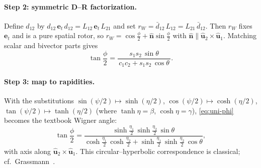 \documentclass[11pt]{article}
\numberwithin{equation}{section}
\providecommand{\uhat}{\hat{\mathbf u}}
\begin{document}
\paragraph{Step 2: symmetric D--R factorization.}
Define $d_{12}$ by $d_{12}\,\mathbf e_t\, d_{12}=L_{12}\,\mathbf e_t\, L_{21}$ and set
$r_W=\bar d_{12}\,L_{12}=L_{21}\,\bar d_{12}$. Then $r_W$ fixes $\mathbf e_t$ and is a pure spatial
rotor, so $r_W=\cos\frac{\phi}{2}+\hat{\mathbf n}\sin\frac{\phi}{2}$ with
$\hat{\mathbf n}\parallel \uhat_2\times\uhat_1$. Matching scalar and bivector parts gives
\begin{equation}
\tan\frac{\phi}{2}=
\frac{s_1 s_2\,\sin\theta}{\,c_1 c_2+s_1 s_2\,\cos\theta\,}.
\label{eq:uni-phi}
\end{equation}

\paragraph{Step 3: map to rapidities.}
With the substitutions $\sin(\psi/2)\mapsto\sinh(\eta/2)$, $\cos(\psi/2)\mapsto\cosh(\eta/2)$,
$\tan(\psi/2)\mapsto\tanh(\eta/2)$ (where $\tanh\eta=\beta$, $\cosh\eta=\gamma$), \eqref{eq:uni-phi}
becomes the textbook Wigner angle:
\begin{equation}
\label{eq:auto:47}
\tan\frac{\phi}{2}
=\frac{\sinh\frac{\eta_1}{2}\,\sinh\frac{\eta_2}{2}\,\sin\theta}
{\cosh\frac{\eta_1}{2}\,\cosh\frac{\eta_2}{2}+\sinh\frac{\eta_1}{2}\,\sinh\frac{\eta_2}{2}\,\cos\theta},
\end{equation}
with axis along $\uhat_2\times\uhat_1$. This circular--hyperbolic correspondence is classical; cf.\ Grassmann~\cite{Grassmann1844}.
\end{document}
